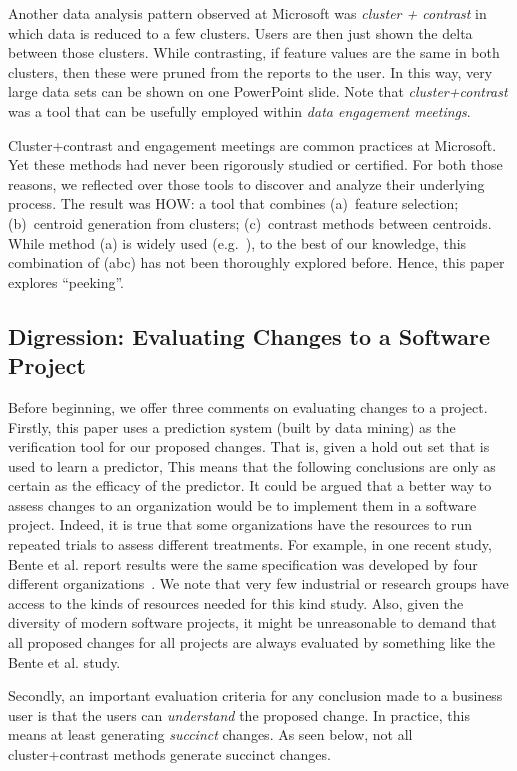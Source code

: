 \documentclass[conference]{IEEEtran}
\begin{document}
	Another data analysis pattern observed
	at Microsoft was  {\em cluster + contrast} in which
	data is  reduced to a few
	clusters. Users are then just shown the delta between those
	clusters. While contrasting, if feature values are
	the same in both clusters, then these were pruned from
	the reports to the user. In this way, very large
	data sets can be shown on one PowerPoint
	slide. Note that {\em cluster+contrast} was a tool that can be usefully employed within
	{\em data engagement meetings}.
	
	
	Cluster+contrast and engagement
	meetings are common practices at Microsoft. Yet  these methods had never been rigorously studied or certified.
	For both those reasons,
	we reflected over those tools to discover and analyze their
	underlying process. The result was HOW: a tool
	that combines (a)~feature selection; (b)~centroid generation from   clusters;
	(c)~contrast methods between centroids.
	While method (a) is widely used (e.g.~\cite{Menzies2010}),
	to the best of our knowledge, this combination of (abc) has not been thoroughly explored before.
	Hence, this paper explores ``peeking''.
	
	\subsection{Digression: Evaluating Changes to a Software Project}
	
Before beginning, we offer three comments on evaluating changes to a project.
Firstly, this paper uses  a prediction system (built by data mining) as the verification
tool for our proposed changes. That is, given a hold out set that is used to learn a predictor,  This means
that the following conclusions are only as certain as the efficacy of the predictor. It could be argued that a better way to assess changes to an organization
would be to implement them in a software project. Indeed, it is true that some organizations have the resources to 
run repeated trials to assess  different treatments.
For example, in one  recent study, Bente et al. report results
were the same  specification   was developed  by four different organizations~\cite{Anda2009}. 
We note that
very few industrial or research groups have access
to the kinds of resources needed for this kind study. Also, given the
diversity of modern software projects, it might be unreasonable to demand that all
proposed changes for all projects are always evaluated by something like the Bente et al. study.

Secondly, an important evaluation criteria for any conclusion made to a business user is that the users can {\em understand} the proposed change. In practice, this means at least
generating {\em succinct} changes. As seen below, not all cluster+contrast methods generate succinct changes.
\end{document}
